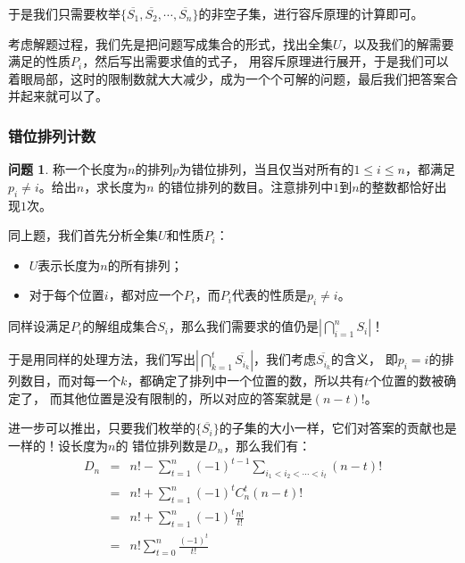 \documentclass{noithesis}
\theoremstyle{plain}      \newtheorem{theorem}{定理}[subsection]
\theoremstyle{definition} \newtheorem{problem}{问题}[subsection]
\begin{document}
于是我们只需要枚举$\{\overline{S_1},\overline{S_2},\cdots,\overline{S_n}\}$的非空子集，进行容斥原理的计算即可。 \par

考虑解题过程，我们先是把问题写成集合的形式，找出全集$U$，以及我们的解需要满足的性质$P_i$，然后写出需要求值的式子，
用容斥原理进行展开，于是我们可以着眼局部，这时的限制数就大大减少，成为一个个可解的问题，最后我们把答案合并起来就可以了。

\subsubsection{错位排列计数}

\begin{problem}
称一个长度为$n$的排列$p$为错位排列，当且仅当对所有的$1 \le i \le n$，都满足$p_i \neq i$。给出$n$，求长度为$n$
的错位排列的数目。注意排列中$1$到$n$的整数都恰好出现$1$次。
\end{problem}
\par

同上题，我们首先分析全集$U$和性质$P_i$：
\begin{itemize}
\item $U$表示长度为$n$的所有排列；
\item 对于每个位置$i$，都对应一个$P_i$，而$P_i$代表的性质是$p_i \neq i$。
\end{itemize}
同样设满足$P_i$的解组成集合$S_i$，那么我们需要求的值仍是$|\bigcap_{i=1}^n{S_i}|$！ \par

于是用同样的处理方法，我们写出$|\bigcap_{k=1}^t{\overline{S_{i_k}}}|$，我们考虑$\overline{S_{i_k}}$的含义，
即$p_i = i$的排列数目，而对每一个$k$，都确定了排列中一个位置的数，所以共有$t$个位置的数被确定了，
而其他位置是没有限制的，所以对应的答案就是$(n-t)!$。 \par

进一步可以推出，只要我们枚举的$\{\overline{S_i}\}$的子集的大小一样，它们对答案的贡献也是一样的！设长度为$n$的
错位排列数是$D_n$，那么我们有：
\begin{eqnarray*}
D_n & = & n! - \sum_{t=1}^n{(-1)^{t-1} \sum_{i_1 < i_2 < \cdots < i_t}(n-t)!} \\
    & = & n! + \sum_{t=1}^n{(-1)^t C_n^t (n-t)!} \\
	& = & n! + \sum_{t=1}^n{(-1)^t \frac{n!}{t!}} \\
	& = & n! \sum_{t=0}^n \frac{(-1)^t}{t!}
\end{eqnarray*}
\par
\end{document}
